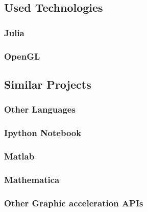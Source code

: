 \subsection{Used Technologies}

\subsubsection{Julia}
\subsubsection{OpenGL}


\subsection{Similar Projects}

\subsubsection{Other Languages}
\subsubsection{Ipython Notebook}
\subsubsection{Matlab}
\subsubsection{Mathematica}
\subsubsection{Other Graphic acceleration APIs}